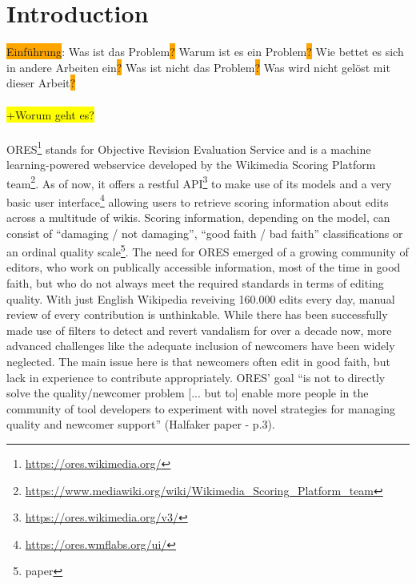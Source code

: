 \documentclass[12pt,a4paper]{article}
\begin{document}
\section{Introduction}
\colorbox{orange}{Einführung}: Was ist das Problem\colorbox{orange}{?} Warum ist es ein Problem\colorbox{orange}{?} Wie bettet es sich in andere Arbeiten ein\colorbox{orange}{?} Was ist nicht das Problem\colorbox{orange}{?} Was wird nicht gelöst mit dieser Arbeit\colorbox{orange}{?}
\\
\\
\colorbox{yellow}{+Worum geht es?}
\\
\\
ORES\footnote{\url{https://ores.wikimedia.org/}} stands for Objective Revision Evaluation Service and is a machine learning-powered webservice developed by the Wikimedia Scoring Platform team\footnote{\url{https://www.mediawiki.org/wiki/Wikimedia_Scoring_Platform_team}}. As of now, it offers a restful API\footnote{\url{https://ores.wikimedia.org/v3/}} to make use of its models and a very basic user interface\footnote{\url{https://ores.wmflabs.org/ui/}} allowing users to retrieve scoring information about edits across a multitude of wikis. Scoring information, depending on the model, can consist of ``damaging / not damaging'', ``good faith / bad faith'' classifications or an ordinal quality scale\footnote{paper}.%
The need for ORES emerged of a growing community of editors, who work on publically accessible information, most of the time in good faith, but who do not always meet the required standards in terms of editing quality. With just English Wikipedia reveiving 160.000 edits every day, manual review of every contribution is unthinkable.
While there has been successfully made use of filters to detect and revert vandalism for over a decade now, more advanced challenges like the adequate inclusion of newcomers have been widely neglected. The main issue here is that newcomers often edit in good faith, but lack in experience to contribute appropriately. ORES' goal ``is not to directly solve the quality/newcomer problem [... but to] enable more people in the community of tool developers to experiment with novel strategies for managing quality and newcomer support'' (Halfaker paper - p.3).
\end{document}
